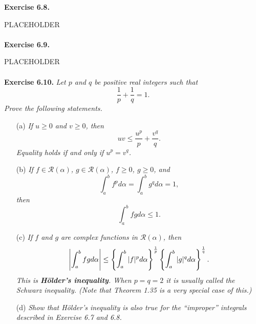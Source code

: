 \documentclass{article}
\begin{document}



\textbf{Exercise 6.8.}

PLACEHOLDER \\\\






\textbf{Exercise 6.9.}

PLACEHOLDER \\\\






\textbf{Exercise 6.10.}
\emph{Let $p$ and $q$ be positive real integers such that
\[
  \frac{1}{p} + \frac{1}{q} = 1.
\]
Prove the following statements.}
\begin{enumerate}
  \item[(a)]
  \emph{If $u \geq 0$ and $v \geq 0$, then
  \[
    uv \leq \frac{u^p}{p} + \frac{v^q}{q}.
  \]
  Equality holds if and only if $u^p = v^q$.}

  \item[(b)]
  \emph{If $f \in \mathscr{R}(\alpha)$, $g \in \mathscr{R}(\alpha)$,
  $f \geq 0$, $g \geq 0$, and
  \[
    \int_{a}^{b} f^p d\alpha = \int_{a}^{b} g^q d\alpha = 1,
  \]
  then
  \[
    \int_{a}^{b} fg d\alpha \leq 1.
  \]}

  \item[(c)]
  \emph{If $f$ and $g$ are complex functions in $\mathscr{R}(\alpha)$, then
  \[
    \abs{ \int_{a}^{b} fg d\alpha }
    \leq
    \left\{ \int_{a}^{b} |f|^p d\alpha \right\}^{\frac{1}{p}}
    \left\{ \int_{a}^{b} |g|^q d\alpha \right\}^{\frac{1}{q}}.
  \]
  This is \textbf{H\"older's inequality}.
  When $p=q=2$ it is usually called the Schwarz inequality.
  (Note that Theorem 1.35 is a very special case of this.)}

  \item[(d)]
  \emph{Show that H\"older's inequality is also true for the ``improper'' integrals
  described in Exercise 6.7 and 6.8.} \\
\end{enumerate}
\end{document}
